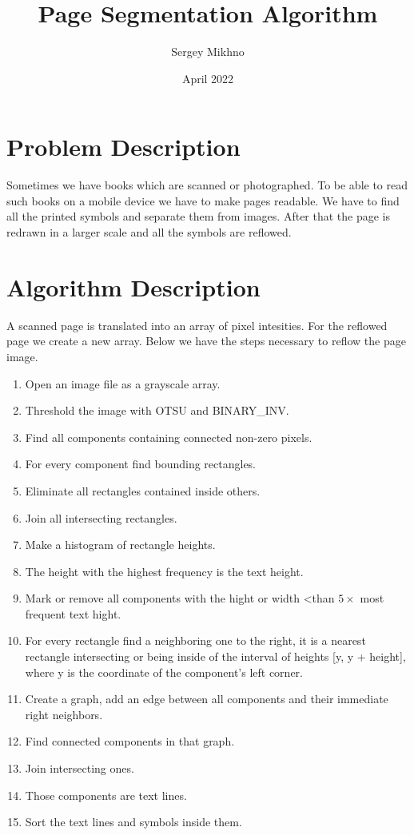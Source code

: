 \documentclass{article}
\title{Page Segmentation Algorithm}
\author{Sergey Mikhno}
\date{April 2022}
\begin{document}
\maketitle

\begin{multicols}{2}
\section{Problem Description}
Sometimes we have books which are scanned or photographed. To be able to read such books on a mobile device we have to make pages readable. We have to find all the printed symbols and separate them from images. After that the page is redrawn in a larger scale and all the symbols are reflowed.

\section{Algorithm Description}

A scanned page is translated into an array of pixel intesities. For the reflowed page we create a new array. Below we have the steps necessary to reflow the page image.

\begin{enumerate}
\item Open an image file as a grayscale array.
\item Threshold the image with OTSU and BINARY\_INV.
\item Find all components containing connected non-zero pixels.
\item For every component find bounding rectangles.
\item Eliminate all rectangles contained inside others.
\item Join all intersecting rectangles.
\item Make a histogram of rectangle heights.
\item The height with the highest frequency is the text height.
\item Mark or remove all components with the hight or width \textless than $ 5 \times $ most frequent text hight.
\item For every rectangle find a neighboring one to the right, it is a nearest rectangle  intersecting or being inside of the interval of heights [y, y + height], where y is the coordinate of the component's left corner.
\item Create a graph, add an edge between all components and their immediate right neighbors.
\item Find connected components in that graph.
\item Join intersecting ones.
\item Those components are text lines.
\item Sort the text lines and symbols inside them.
\end{enumerate}

\end{multicols}
	

	
\end{document}
